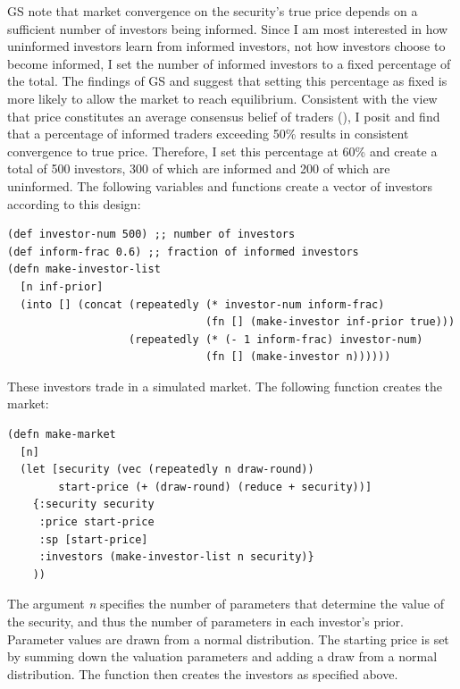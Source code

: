 \documentclass[11pt]{article}
\begin{document}
GS note that market convergence on the security's true price depends on a sufficient number of investors being informed. Since I am most interested in how uninformed investors learn from informed investors, not how investors choose to become informed, I set the number of informed investors to a fixed percentage of the total. The findings of GS and \citet{routledgeAdaptiveLearningFinancial1999} suggest that setting this percentage as fixed is more likely to allow the market to reach equilibrium. Consistent with the view that price constitutes an average consensus belief of traders (\citet{verrecchiaConsensusBeliefsInformation1980}), I posit and find that a percentage of informed traders exceeding 50\% results in consistent convergence to true price. Therefore, I set this percentage at 60\% and create a total of 500 investors, 300 of which are informed and 200 of which are uninformed. The following variables and functions create a vector of investors according to this design:

\singlespacing
\lstset{language=Lisp,label= ,caption= ,captionpos=b,numbers=none}
\begin{lstlisting}
(def investor-num 500) ;; number of investors
(def inform-frac 0.6) ;; fraction of informed investors
(defn make-investor-list
  [n inf-prior]
  (into [] (concat (repeatedly (* investor-num inform-frac)
                               (fn [] (make-investor inf-prior true))) 
                   (repeatedly (* (- 1 inform-frac) investor-num)
                               (fn [] (make-investor n))))))
\end{lstlisting}
\doublespacing

These investors trade in a simulated market. The following function creates the market:

\singlespacing
\lstset{language=Lisp,label= ,caption= ,captionpos=b,numbers=none}
\begin{lstlisting}
(defn make-market
  [n]
  (let [security (vec (repeatedly n draw-round))
        start-price (+ (draw-round) (reduce + security))] 
    {:security security
     :price start-price
     :sp [start-price]
     :investors (make-investor-list n security)}
    ))
\end{lstlisting}
\doublespacing

The argument \emph{n} specifies the number of parameters that determine the value of the security, and thus the number of parameters in each investor's prior. Parameter values are drawn from a normal distribution. The starting price is set by summing down the valuation parameters and adding a draw from a normal distribution. The function then creates the investors as specified above.
\end{document}

